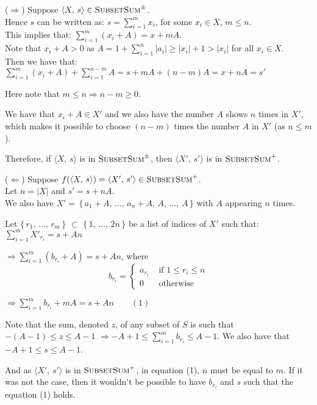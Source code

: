 \documentclass{article}
\begin{document}
\bigskip\noindent ($\Rightarrow$) Suppose $\langle X,\, s\rangle\in\textsc{SubsetSum}^\pm$.
\\\smallskip Hence $s$ can be written as:
$s=\sum_{i=1} ^{m} x_i$, for some $x_i\in X$, $m\leq n$.
\\\smallskip This implies that:
$\sum_{i=1} ^{m} (x_i+A) = x+mA$.
\\\smallskip Note that $x_i+A>0$ as $A=1+\sum_{i=1} ^{n} |a_i|\geq|x_i|+1>|x_i|$ for all $x_i\in X$.
\\\smallskip Then we have that:
\\$\sum_{i=1} ^{m} (x_i+A)+\sum_{i=1} ^{n-m} A=s+mA+(n-m)A=x+nA=s'$

\smallskip\noindent Here note that $m\leq n\Rightarrow n-m \geq 0$.

\smallskip\noindent We have that $x_i +A\in X'$ and we also have the number $A$ shows $n$ times in $X'$, which makes it possible to choose $(n-m)$ times the number $A$ in $X'$ (as $n\leq m$).

\medskip\noindent Therefore, if $\langle X,\, s\rangle$ is in $\textsc{SubsetSum}^\pm$, then $\langle X',\, s'\rangle$ is in $\textsc{SubsetSum}^+$.

\bigskip
\bigskip\noindent ($\Leftarrow$) Suppose $f(\langle X,\, s\rangle)=\langle X',\, s'\rangle\in\textsc{SubsetSum}^+$.
\\Let $n=|X|$ and $s'=s+nA$.
\\We also have $X'=\,\{\,a_1+A,\,\dots,\,a_n+A,\,A,\,\dots,\,A\,\}$ with $A$ appearing $n$ times.

\medskip\noindent Let $\{\,r_1,\,\dots,\,r_m\,\}$ $\subset$ $\{\,1,\,\dots,\,2n\,\}$ be a list of indices of $X'$ such that:
\\ $\sum_{i=1} ^{m} X'_{r_i}=s+An$

\medskip$\Rightarrow\sum_{i=1} ^{m} (b_{r_i}+A)=s+An$, where  $$b_{r_i} = \left\{\begin{array}{ll}
 a_{r_i} & \mbox{ if $1\leq r_i\leq n$}\\
 0 & \mbox{ otherwise}
 \end{array}\right.$$
 
\medskip $\Rightarrow\sum_{i=1} ^{m} b_{r_i}+mA=s+An\quad\quad (1)$

\medskip\noindent Note that the sum, denoted $z$, of any subset of $S$ is such that $-(A-1)\leq z \leq A-1$ $\Rightarrow -A+1\leq\sum_{i=1} ^{m} b_{r_i} \leq A-1$. We also have that $-A+1\leq s \leq A-1$.

\medskip\noindent And as $\langle X',\, s'\rangle$ is in $\textsc{SubsetSum}^+$, in equation (1), $n$ must be equal to $m$. If it was not the case, then it wouldn't be possible to have $b_{r_i}$ and $s$ such that the equation (1) holds.
\end{document}
